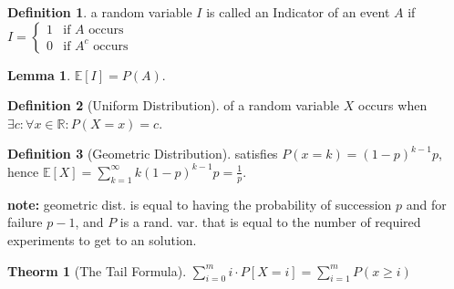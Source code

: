 \documentclass[]{article}
\theoremstyle{definition}
\newtheorem{Theorem}{\color{theoColor}Theorm}
\newtheorem{Definition}{\color{defiColor}Definition}
\newtheorem{Lemma}{\color{lemColor}Lemma}
\newcommand\defi  [1] {\begin{Definition}#1\end{Definition}}
\newcommand\lem   [1] {\begin{Lemma}#1\end{Lemma}}
\newcommand\R     {\mathbb{R}}
\newcommand\E     {\mathbb{E}}
\renewcommand\inf {\infty}
\newcommand\co        {\colon}
\begin{document}
\begin{multicols}{4}
			\defi{a random variable $I$ is called an \color{defiColor}Indicator of an event $A$\color{black} if $I = \begin{cases}
					1 & \text{if $A$ occurs} \\
					0 & \text{if $A^c$ occurs}
				\end{cases}$}
			\lem{$\E[I] = P(A)$. }
			\begin{Definition}[Uniform Distribution]
					of a random variable $X$ occurs when $\exists c \co \forall x \in \R \co P(X = x) = c$. 
			\end{Definition}
			\begin{Definition}[Geometric Distribution]
					satisfies $P(x = k) = (1 - p)^{k - 1}p$, hence $\E[X] = \sum_{k = 1}^{\inf} k(1 - p)^{k - 1}p = \frac{1}{p}$. 
			\end{Definition}
			\textbf{note: }geometric dist. is equal to having the probability of succession $p$ and for failure $p - 1$, and $P$ is a rand. var. that is equal to the number of required experiments to get to an solution. 
			\begin{Theorem}[The Tail Formula]
				\hfil $\sum_{i = 0}^{m}i \cdot P[X = i] = \sum_{i = 1}^{m} P(x \ge i)$
			\end{Theorem}
		

\end{multicols}
\end{document}
